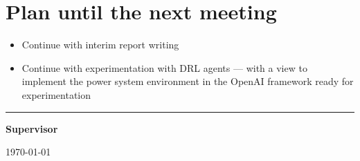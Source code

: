 \documentclass[12pt]{article}
\begin{document}
	\section{Plan until the next meeting}
	\begin{itemize}
		\item Continue with interim report writing
		\item Continue with experimentation with DRL agents --- with a view to implement the power system environment in the OpenAI framework ready for experimentation
	\end{itemize}
	
	\par
	\vspace{\fill}%
	\noindent\rule{0.4\linewidth}{0.5pt}%
	\vspace{1em}%
	\par
	\noindent\textbf{Supervisor}\vspace{1em}%
	\par
	\noindent\today
\end{document}
